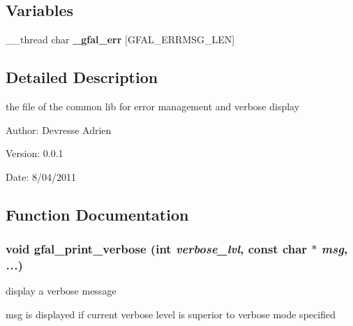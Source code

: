 \subsection*{Variables}
\begin{CompactItemize}
\item 
\_\-\_\-thread char \textbf{\_\-gfal\_\-err} [GFAL\_\-ERRMSG\_\-LEN]\label{gfal__common__errverbose_8c_e2d33dc17390b0f831960c3682469046}

\end{CompactItemize}


\subsection{Detailed Description}
the file of the common lib for error management and verbose display 

\begin{Desc}
\item[Author:]Devresse Adrien \end{Desc}
\begin{Desc}
\item[Version:]0.0.1 \end{Desc}
\begin{Desc}
\item[Date:]8/04/2011 \end{Desc}


\subsection{Function Documentation}
\subsubsection{\setlength{\rightskip}{0pt plus 5cm}void gfal\_\-print\_\-verbose (int {\em verbose\_\-lvl}, const char $\ast$ {\em msg},  {\em ...})}\label{gfal__common__errverbose_8c_8b05640b4b43a776603bd93703c29d30}


display a verbose message 

msg is displayed if current verbose level is superior to verbose mode specified 
